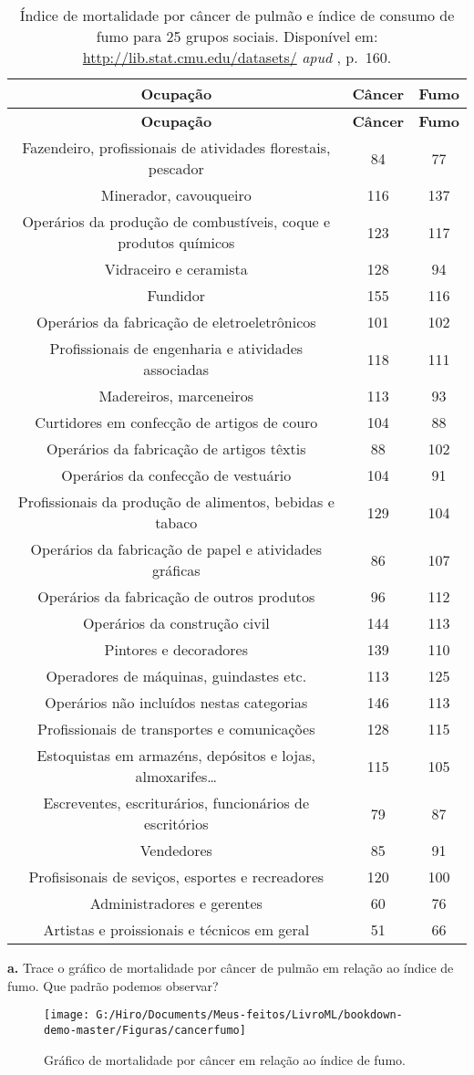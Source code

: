 \documentclass[
  openany]{book}
\begin{document}
\begin{longtable}[]{@{}ccc@{}}
\caption{\label{tab:cancercigarro} Índice de mortalidade por câncer de pulmão e índice de consumo de fumo para 25 grupos sociais. Disponível em: \url{http://lib.stat.cmu.edu/datasets/} \emph{apud} \citep{morettin2017estatistica}, p.~160.}\tabularnewline
\toprule
\textbf{Ocupação} & \textbf{Câncer} & \textbf{Fumo}\tabularnewline
\midrule
\endfirsthead
\toprule
\textbf{Ocupação} & \textbf{Câncer} & \textbf{Fumo}\tabularnewline
\midrule
\endhead
Fazendeiro, profissionais de atividades florestais, pescador & 84 & 77\tabularnewline
Minerador, cavouqueiro & 116 & 137\tabularnewline
Operários da produção de combustíveis, coque e produtos químicos & 123 & 117\tabularnewline
Vidraceiro e ceramista & 128 & 94\tabularnewline
Fundidor & 155 & 116\tabularnewline
Operários da fabricação de eletroeletrônicos & 101 & 102\tabularnewline
Profissionais de engenharia e atividades associadas & 118 & 111\tabularnewline
Madereiros, marceneiros & 113 & 93\tabularnewline
Curtidores em confecção de artigos de couro & 104 & 88\tabularnewline
Operários da fabricação de artigos têxtis & 88 & 102\tabularnewline
Operários da confecção de vestuário & 104 & 91\tabularnewline
Profissionais da produção de alimentos, bebidas e tabaco & 129 & 104\tabularnewline
Operários da fabricação de papel e atividades gráficas & 86 & 107\tabularnewline
Operários da fabricação de outros produtos & 96 & 112\tabularnewline
Operários da construção civil & 144 & 113\tabularnewline
Pintores e decoradores & 139 & 110\tabularnewline
Operadores de máquinas, guindastes etc. & 113 & 125\tabularnewline
Operários não incluídos nestas categorias & 146 & 113\tabularnewline
Profissionais de transportes e comunicações & 128 & 115\tabularnewline
Estoquistas em armazéns, depósitos e lojas, almoxarifes\ldots{} & 115 & 105\tabularnewline
Escreventes, escriturários, funcionários de escritórios & 79 & 87\tabularnewline
Vendedores & 85 & 91\tabularnewline
Profisisonais de seviços, esportes e recreadores & 120 & 100\tabularnewline
Administradores e gerentes & 60 & 76\tabularnewline
Artistas e proissionais e técnicos em geral & 51 & 66\tabularnewline
\bottomrule
\end{longtable}

\newpage

\textbf{a.} Trace o gráfico de mortalidade por câncer de pulmão em relação ao índice de fumo. Que padrão podemos observar?

\begin{figure}

{\centering \texttt{[image: G:/Hiro/Documents/Meus-feitos/LivroML/bookdown-demo-master/Figuras/cancerfumo]} 

}

\caption{Gráfico de mortalidade por câncer em relação ao índice de fumo.}\label{fig:cancerfumo}
\end{figure}
\end{document}
